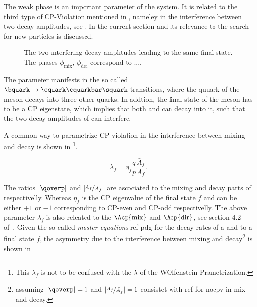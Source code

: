 The weak phase \phis is an important parameter of the \BBbarSyst system. It is related to the third
type of CP-Violation mentioned in , nameley in the interference between
two decay amplitudes, see . In the current section \phis and its relevance to
the search for new particles is discussed.

\newcommand{\ffig}{f}
\newcommand{\phimixfig}{\phi_\text{mix}}
\newcommand{\phifig}{\phi_\text{dec}}
\newcommand{\phibarfig}{\kern 0.15em \overline{\kern -0.15em \phi_\text{dec} \kern -0.60em} \kern 0.60em}
\begin{figure}[h]
  \centering
  \resizebox{0.4\textwidth}{!}{}
  \caption{The two interfering decay amplitudes leading to the same final state.
           The phases $\phimixfig$, $\phifig$ correspond to ....
           }
  \label{interference}
\end{figure}

The parameter \phis manifests in the so called $\bquark \rightarrow \cquark\cquarkbar\squark $ transitions, where the
\bquark quuark of the \Bs meson decays into three other quarks. In addtion, the final state of the \Bs meson has to be
a CP eigenstate, which implies that both \Bs and \Bsb can decay into it, such that the two decay amplitudes of 
can interfere.

A common way to parametrize CP violation in the interference between mixing and decay is shown in 
\footnote{This $\lambda_f$ is not to be confused with the $\lambda$ of the WOlfenstein Prametrization.}.

\begin{equation}
 \lambda_{f} = \eta_f \frac{q}{p} \frac{\bar{A}_f}{A_f}. %
\label{lambda_cpv}
\end{equation}

\noindent The ratios $|\qoverp|$ and $|\nicefrac{A_f}{\bar{A}_{f}}|$ are ascociated to the mixing and decay parts of  respectivelly.
Whereas $\eta_f$ is the CP eigenvalue of the final state $f$ and can be either $+1$ or $-1$ corresponding to CP-even and CP-odd respectivelly.
The above parameter $\lambda_f$ is also releated to the $\Acp{\rm mix}$ and $\Acp{\rm dir}$, see section 4.2 of~\cite{DeBruyn-thesis}.
Given the so called {\it master equations}{\color{red} ref pdg} for the decay rates of a \Bs and \Bsb
to a final state $f$, the \CP asymmetry due to the interference between mixing and decay\footnote{assuming $|\qoverp|=1$ and $|\nicefrac{A_f}{\bar{A}_{\bar{f}}}| = 1$ consistet with {\color{red} ref for nocpv in mix and decay}.}
is shown in 

